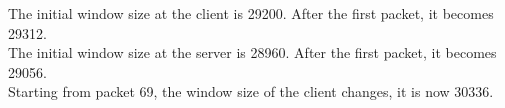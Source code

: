 The initial window size at the client is 29200. After the first packet, it becomes 29312. \\
The initial window size at the server is 28960. After the first packet, it becomes 29056. \\
Starting from packet 69, the window size of the client changes, it is now 30336.